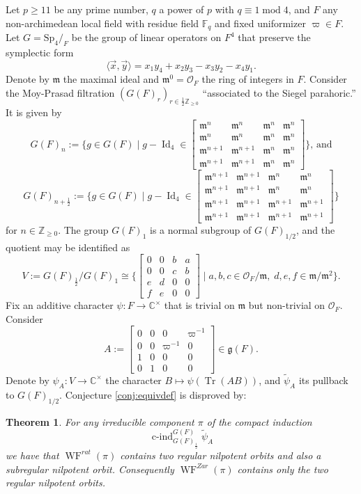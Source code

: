 \documentclass[11pt]{amsart}
\newtheorem{theorem}{Theorem}[section]
\theoremstyle{remark}
\newcommand{\F}{\mathbb{F}}
\newcommand{\Z}{\mathbb{Z}}
\newcommand{\Cc}{\mathbb{C}^{\times}}
\newcommand{\f}{\mathfrak{f}}
\newcommand{\cO}{\mathcal{O}}
\newcommand{\til}{\tilde}
\newcommand{\ra}{\rightarrow}
\newcommand{\Tr}{\operatorname{Tr}}
\newcommand{\Id}{\operatorname{Id}}
\newcommand{\fg}{\mathfrak{g}}
\newcommand{\fm}{\mathfrak{m}}
\newcommand{\matr}[1]{\left[\begin{matrix}#1\end{matrix}\right]}
\newcommand{\WF}{\operatorname{WF}}
\newcommand{\Sp}{\mathrm{Sp}}
\begin{document}
Let $p\ge 11$ be any prime number, $q$ a power of $p$ with $q\equiv 1\operatorname{mod}4$, and $F$ any non-archimedean local field with residue field $\F_q$ and fixed uniformizer $\varpi\in F$. Let $G=\Sp_4/_F$ be the group of linear operators on $F^4$ that preserve the symplectic form
\begin{equation}\label{form1}
\langle \vec{x},\vec{y}\rangle=x_1y_4+x_2y_3-x_3y_2-x_4y_1.
\end{equation}
Denote by $\fm$ the maximal ideal and $\fm^0=\cO_F$ the ring of integers in $F$. Consider the Moy-Prasad filtration $(G(F)_r)_{r\in\frac{1}{2}\Z_{\ge 0}}$ ``associated to the Siegel parahoric.'' It is given by
\[
G(F)_n:=\{g\in G(F)\;|\;g-\Id_4\in
\matr{
	\fm^n&\fm^n&\fm^n&\fm^n\\
	\fm^n&\fm^n&\fm^n&\fm^n\\
	\fm^{n+1}&\fm^{n+1}&\fm^n&\fm^n\\
	\fm^{n+1}&\fm^{n+1}&\fm^n&\fm^n	
}
\}\text{, and}
\]
\begin{equation}\label{MP}
G(F)_{n+\frac{1}{2}}:=\{g\in G(F)\;|\;g-\Id_4\in
\matr{
	\fm^{n+1}&\fm^{n+1}&\fm^n&\fm^n\\
	\fm^{n+1}&\fm^{n+1}&\fm^n&\fm^n\\
	\fm^{n+1}&\fm^{n+1}&\fm^{n+1}&\fm^{n+1}\\
	\fm^{n+1}&\fm^{n+1}&\fm^{n+1}&\fm^{n+1}	
}
\}
\end{equation}
for $n\in\Z_{\ge 0}$. The group $G(F)_1$ is a normal subgroup of $G(F)_{1/2}$, and the quotient may be identified as
\[
V:=G(F)_{\frac{1}{2}}/G(F)_1\cong\{\matr{0&0&b&a\\0&0&c&b\\e&d&0&0\\f&e&0&0}\;|\;a,b,c\in\cO_F/\fm,\;d,e,f\in \fm/\fm^2\}.
\]
Fix an additive character $\psi:F\ra\Cc$ that is trivial on $\fm$ but non-trivial on $\cO_F$. Consider
\begin{equation}\label{A}
A:=\matr{
	0&0&0&\varpi^{-1}\\
	0&0&\varpi^{-1}&0\\
	1&0&0&0\\
	0&1&0&0
}\in\fg(F).
\end{equation}
Denote by $\psi_A:V\ra\Cc$ the character $B\mapsto \psi(\Tr(AB))$, and $\til{\psi}_A$ its pullback to $G(F)_{1/2}$. Conjecture \ref{conj:equivdef} is disproved by:

\begin{theorem}\label{main}
	For any irreducible component $\pi$ of the compact induction
	\[
	\operatorname{c-ind}_{G(F)_{\frac{1}{2}}}^{G(F)}\til{\psi}_{A}
	\]
	we have that $\WF^{rat}(\pi)$ contains two regular nilpotent orbits and also a subregular nilpotent orbit. Consequently $\WF^{Zar}(\pi)$ contains only the two regular nilpotent orbits.
\end{theorem}
\end{document}
